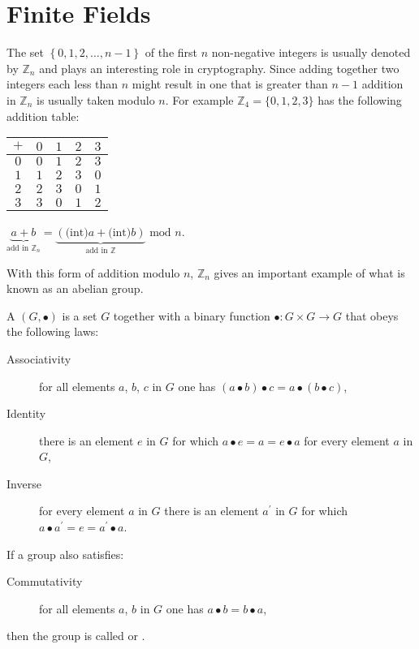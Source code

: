 
\section{Finite Fields}


The set $\left\{0, 1, 2, \dots, n-1\right\}$ of the first $n$ non-negative
integers is usually denoted by $\mathbb{Z}_n$ and plays an interesting role in
cryptography. Since adding together two integers each less than $n$ might result in
one that is greater than $n-1$ addition in $\mathbb{Z}_n$ is usually taken modulo $n$.
For example $\mathbb{Z}_4 = \{0,1,2,3\}$ has the following addition table:

\begin{tabular}{|c|cccc|}\hline
  $+$ & $0$ & $1$ & $2$ & $3$ \\ \hline
  $0$ & $0$ & $1$ & $2$ & $3$ \\
  $1$ & $1$ & $2$ & $3$ & $0$ \\
  $2$ & $2$ & $3$ & $0$ & $1$ \\
  $3$ & $3$ & $0$ & $1$ & $2$ \\ \hline
\end{tabular}
\qquad\qquad
$\underbrace{a+b}_{\mbox{add in }\mathbb{Z}_n}
= \underbrace{(\mbox{(int)}a + \mbox{(int)}b)}_{\mbox{add in }\mathbb{Z}} \mbox{ mod } n$.

\noindent With this form of addition modulo $n$, $\mathbb{Z}_n$ gives an important example
of what is known as an abelian group.

A  $(G, \bullet)$ is a set $G$ together with a binary function
$\bullet\colon G\times G\rightarrow G$ that obeys the following laws:
\begin{description}
  \item[Associativity] for all elements $a$, $b$, $c$ in $G$ one has
  $(a\bullet b)\bullet c = a\bullet(b\bullet c)$,
  \item[Identity] there is an element $e$ in $G$ for which $a\bullet e=a=e\bullet a$
  for every element $a$ in $G$,
  \item[Inverse] for every element $a$ in $G$ there is an element $a^\prime$ in $G$
  for which $a\bullet a^\prime=e=a^\prime\bullet a$.
\end{description}
If a group also satisfies:
\begin{description}
  \item[Commutativity] for all elements $a$, $b$ in $G$ one has $a\bullet b=b\bullet a$,
\end{description}
then the group is called  or .

